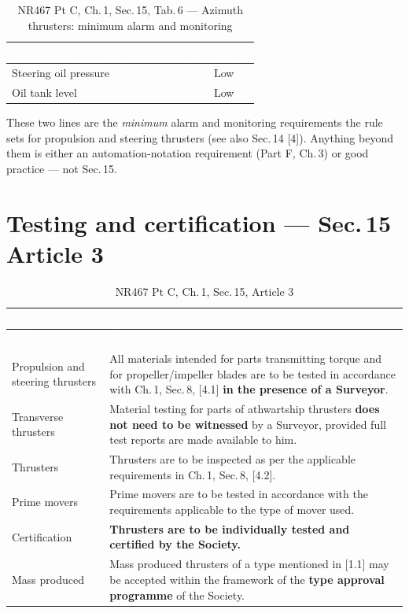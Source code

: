 \documentclass[11pt,a4paper]{report}
\begin{document}
\begin{table}[H]
\centering
\small
\caption{NR467 Pt C, Ch.\,1, Sec.\,15, Tab.\,6 --- Azimuth thrusters: minimum alarm and monitoring}
\label{tab:s15t6}
\begin{tabular}{|p{7cm}|p{4cm}|}
\hline
\rowcolor{bvblue}
\textcolor{white}{\textbf{Identification of system parameter}} & \textcolor{white}{\textbf{Alarm}} \\
\hline
Steering oil pressure & Low \\
\hline
Oil tank level & Low \\
\hline
\end{tabular}
\end{table}

\noindent These two lines are the \emph{minimum} alarm and monitoring
requirements the rule sets for propulsion and steering thrusters (see also
Sec.\,14 [4]). Anything beyond them is either an automation-notation
requirement (Part F, Ch.\,3) or good practice --- not Sec.\,15.

\section{Testing and certification --- Sec.\,15 Article 3}

\begin{longtable}{|p{3.3cm}|p{11.6cm}|}
\caption{NR467 Pt C, Ch.\,1, Sec.\,15, Article 3} \label{tab:s15test} \\
\hline
\rowcolor{bvblue}
\textcolor{white}{\textbf{Reference}} & \textcolor{white}{\textbf{Requirement}} \\
\hline
\endfirsthead
\hline
\rowcolor{bvblue}
\textcolor{white}{\textbf{Reference}} & \textcolor{white}{\textbf{Requirement}} \\
\hline
\endhead
\hline
\endlastfoot
[3.1.1] Propulsion and steering thrusters & All materials intended for parts transmitting torque and for propeller/impeller blades are to be tested in accordance with Ch.\,1, Sec.\,8, [4.1] \textbf{in the presence of a Surveyor}. \\
\hline
[3.1.2] Transverse thrusters & Material testing for parts of athwartship thrusters \textbf{does not need to be witnessed} by a Surveyor, provided full test reports are made available to him. \\
\hline
[3.2.1] Thrusters & Thrusters are to be inspected as per the applicable requirements in Ch.\,1, Sec.\,8, [4.2]. \\
\hline
[3.2.2] Prime movers & Prime movers are to be tested in accordance with the requirements applicable to the type of mover used. \\
\hline
[3.3.1] Certification & \textbf{Thrusters are to be individually tested and certified by the Society.} \\
\hline
[3.3.2] Mass produced & Mass produced thrusters of a type mentioned in [1.1] may be accepted within the framework of the \textbf{type approval programme} of the Society. \\
\hline
\end{longtable}
\end{document}
